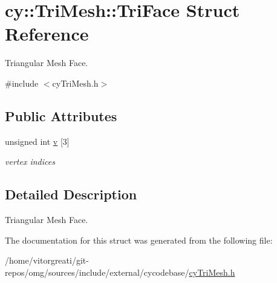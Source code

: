 \hypertarget{structcy_1_1_tri_mesh_1_1_tri_face}{}\section{cy\+::Tri\+Mesh\+::Tri\+Face Struct Reference}
\label{structcy_1_1_tri_mesh_1_1_tri_face}


Triangular Mesh Face.  




{\ttfamily \#include $<$cy\+Tri\+Mesh.\+h$>$}

\subsection*{Public Attributes}
\begin{DoxyCompactItemize}
\item 
\mbox{\label{structcy_1_1_tri_mesh_1_1_tri_face_a565af0712b113a1624017750b42764bd}} 
unsigned int \mbox{\hyperlink{structcy_1_1_tri_mesh_1_1_tri_face_a565af0712b113a1624017750b42764bd}{v}} \mbox{[}3\mbox{]}
\begin{DoxyCompactList}\small\item\em vertex indices \end{DoxyCompactList}\end{DoxyCompactItemize}


\subsection{Detailed Description}
Triangular Mesh Face. 

The documentation for this struct was generated from the following file\+:\begin{DoxyCompactItemize}
\item 
/home/vitorgreati/git-\/repos/omg/sources/include/external/cycodebase/\mbox{\hyperlink{cy_tri_mesh_8h}{cy\+Tri\+Mesh.\+h}}\end{DoxyCompactItemize}
